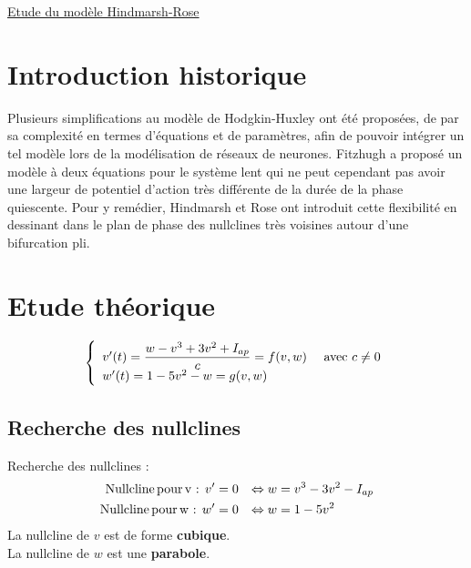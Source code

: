 \documentclass[12pt,a4paper,onecolumn]{article}
\begin{document}
\href{https://tel.archives-ouvertes.fr/tel-00453912v1/document}{Etude du  modèle Hindmarsh-Rose}


\newpage
\tableofcontents

\newpage

\section{Introduction historique}


Plusieurs simplifications au modèle de Hodgkin-Huxley \cite{hodgkin1952quantitative} ont été proposées, de par sa complexité en termes d'équations et de paramètres, afin de pouvoir intégrer un tel modèle lors de la modélisation de réseaux de neurones. Fitzhugh a proposé un modèle \cite{fitzhugh1961impulses} à deux équations pour le système lent qui ne peut cependant pas avoir une largeur de potentiel d'action très différente de la durée de la phase quiescente. Pour y remédier, Hindmarsh et Rose ont introduit cette flexibilité \cite{hindmarsh1982model} en dessinant dans le plan de phase des nullclines très voisines autour d'une bifurcation pli.

\section{Etude théorique}


\begin{equation}
\left\{
\begin{array}{l l}
v'(t)= \displaystyle{\frac{w - v^3 + 3v^2 +I_{ap}}{c}} = f(v,w) & \text{ avec } c\neq 0\\
w'(t) = 1 - 5 v^2 - w = g(v,w) & \\
\end{array}
\right.
\end{equation}

\subsection{Recherche des nullclines}

Recherche des nullclines :
\begin{align*}
\text{Nullcline\,pour\,v : } v' &= 0  &\Leftrightarrow w &= v^3 - 3 v^2 - I_{ap}\\
\text{Nullcline\,pour\,w : } w' &= 0 &\Leftrightarrow w &= 1-5v^2
\end{align*}
La nullcline de $v$ est de forme \textbf{cubique}. \\
La nullcline de $w$ est une \textbf{parabole}.
\end{document}
